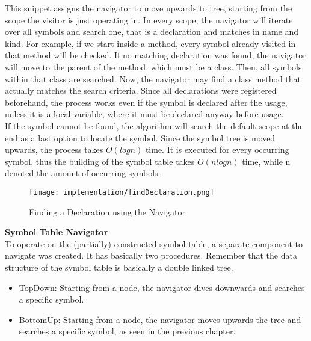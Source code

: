 This snippet assigns the navigator to move upwards to tree, starting from the scope the visitor is just operating in.
In every scope, the navigator will iterate over all symbols and search one, that is a declaration and matches in name and kind.
For example, if we start inside a method, every symbol already visited in that method will be checked.
If no matching declaration was found, the navigator will move to the parent of the method, which must be a class.
Then, all symbols within that class are searched.
Now, the navigator may find a class method that actually matches the search criteria.
Since all declarations were registered beforehand, the process works even if the symbol is declared after the usage, unless it is a local variable, where it must be declared anyway before usage.\\

If the symbol cannot be found, the algorithm will search the default scope at the end as a last option to locate the symbol.
Since the symbol tree is moved upwards, the process takes $O(logn)$ time.
It is executed for every occurring symbol, thus the building of the symbol table takes $O(nlogn)$ time, while n denoted the amount of occurring symbols.\\

\begin{figure}[h]
    \centering
    \texttt{[image: implementation/findDeclaration.png]}
    \caption{Finding a Declaration using the Navigator}
    \label{fig:findDecl}
\end{figure}


\textbf{Symbol Table Navigator}\\
To operate on the (partially) constructed symbol table, a separate component to navigate was created.
It has basically two procedures.
Remember that the data structure of the symbol table is basically a double linked tree.

\begin{itemize}
\item TopDown: Starting from a node, the navigator dives downwards and searches a specific symbol.
\item BottomUp: Starting from a node, the navigator moves upwards the tree and searches a specific symbol, as seen in the previous chapter.
\end{itemize}

 \\

